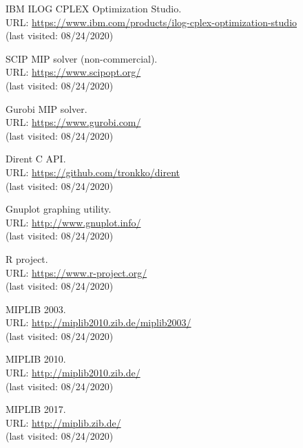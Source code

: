 \documentclass[a4paper,12pt,twoside]{scrbook}
\begin{document}
\begin{thebibliography}{9}
	 IBM ILOG CPLEX Optimization Studio. \\ URL: \url{https://www.ibm.com/products/ilog-cplex-optimization-studio} \\ (last visited: 08/24/2020)

	 SCIP MIP solver (non-commercial). \\ URL: \url{https://www.scipopt.org/} \\ (last visited: 08/24/2020)

	 Gurobi MIP solver. \\ URL: \url{https://www.gurobi.com/} \\ (last visited: 08/24/2020)

	 Dirent C API. \\ URL: \url{https://github.com/tronkko/dirent} \\ (last visited: 08/24/2020)

	 Gnuplot graphing utility. \\ URL: \url{http://www.gnuplot.info/} \\ (last visited: 08/24/2020)

	 R project. \\ URL: \url{https://www.r-project.org/} \\ (last visited: 08/24/2020)

	 MIPLIB 2003. \\ URL: \url{http://miplib2010.zib.de/miplib2003/} \\ (last visited: 08/24/2020)

	 MIPLIB 2010. \\ URL: \url{http://miplib2010.zib.de/} \\ (last visited: 08/24/2020)

	 MIPLIB 2017. \\ URL: \url{http://miplib.zib.de/} \\ (last visited: 08/24/2020)
	
\end{thebibliography}
\end{document}
